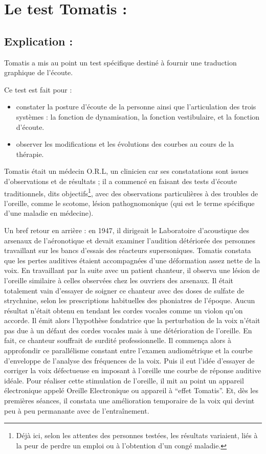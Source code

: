\chapter{Le test Tomatis : }

\section{Explication :}

Tomatis a mis au point un test spécifique destiné à fournir une traduction
graphique de l'écoute.

Ce test est fait pour :
\begin{itemize}
\item constater la posture d'écoute de la personne ainsi que l'articulation
des trois systèmes : la fonction de dynamisation, la fonction vestibulaire,
et la fonction d'écoute.
\item observer les modifications et les évolutions des courbes au cours
de la thérapie.
\end{itemize}
Tomatis était un médecin O.R.L, un clinicien car ses constatations
sont issues d'observations et de résultats ; il a commencé en faisant
des tests d'écoute traditionnels, dits objectifs\footnote{Déjà ici, selon les attentes des personnes testées, les résultats
variaient, liés à la peur de perdre un emploi ou à l'obtention d'un
congé maladie.}, avec des observations particulières à des troubles de l'oreille,
comme le scotome, lésion pathognomonique (qui est le terme spécifique
d'une maladie en médecine). 

Un bref retour en arrière : en 1947, il dirigeait le Laboratoire d'acoustique
des arsenaux de l'aéronotique et devait examiner l'audition détériorée
des personnes travaillant sur les bancs d'essais des réacteurs supersoniques.
Tomatis constata que les pertes auditives étaient accompagnées d'une
déformation assez nette de la voix. En travaillant par la suite avec
un patient chanteur, il observa une lésion de l'oreille similaire
à celles observées chez les ouvriers des arsenaux. Il était totalement
vain d'essayer de soigner ce chanteur avec des doses de sulfate de
strychnine, selon les prescriptions habituelles des phoniatres de
l'époque. Aucun résultat n'était obtenu en tendant les cordes vocales
comme un violon qu'on accorde. Il émit alors l'hypothèse fondatrice
que la perturbation de la voix n'était pas due à un défaut des cordes
vocales mais à une détérioration de l'oreille. En fait, ce chanteur
souffrait de surdité professionnelle. Il commença alors à approfondir
ce parallélisme constant entre l'examen audiométrique et la courbe
d'enveloppe de l'analyse des fréquences de la voix. Puis il eut l'idée
d'essayer de corriger la voix défectueuse en imposant à l'oreille
une courbe de réponse auditive idéale. Pour réaliser cette stimulation
de l'oreille, il mit au point un appareil électronique appelé Oreille
Electronique ou appareil à ``effet Tomatis''. Et, dès les premières
séances, il constata une amélioration temporaire de la voix qui devint
peu à peu permanante avec de l'entraînement. 

